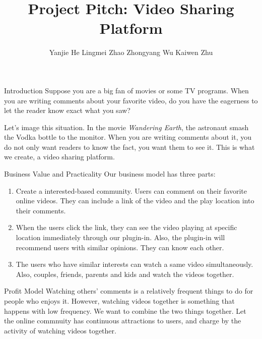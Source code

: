 \documentclass{beamer}
\title{Project Pitch: Video Sharing Platform}
\author{Yanjie He \quad Lingmei Zhao \quad Zhongyang Wu \quad Kaiwen Zhu}
\begin{document}
\begin{frame}[plain]
    \maketitle
\end{frame}

\begin{frame}{Introduction}
Suppose you are a big fan of movies or some TV programs. When you are writing comments about your favorite video, do you have the eagerness to let the reader know exact what you saw?
\newline

Let's image this situation. In the movie \textit{Wandering Earth}, the astronaut smash the Vodka bottle to the monitor. When you are writing comments about it, you do not only want readers to know the fact, you want them to see it. This is what we create, a video sharing platform.
\end{frame}

\begin{frame}{Business Value and Practicality}
Our business model has three parts:

\begin{enumerate}
	\item Create a interested-based community. Users can comment on their favorite online videos. They can include a link of the video and the play location into their comments.
	\item When the users click the link, they can see the video playing at specific location immediately through our plugin-in. Also, the plugin-in will recommend users with similar opinions. They can know each other.
	\item The users who have similar interests can watch a same video simultaneously. Also, couples, friends, parents and kids and watch the videos together.
\end{enumerate}
\end{frame}

\begin{frame}{Profit Model}
Watching others' comments is a relatively frequent things to do for people who enjoys it. However, watching videos together is something that happens with low frequency. We want to combine the two things together. Let the online commnuity has continuous attractions to users, and charge by the activity of watching videos together.
\end{frame}
\end{document}
